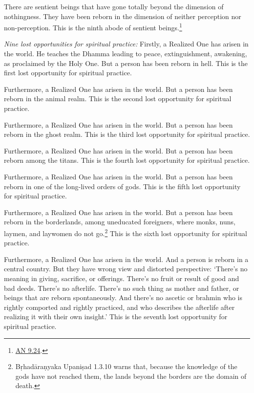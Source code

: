 \documentclass[12pt,openany]{book}%
\begin{document}
There are sentient beings that have gone totally beyond the dimension of nothingness. They have been reborn in the dimension of neither perception nor non-perception. This is the ninth abode of sentient beings.\footnote{\href{https://suttacentral.net/an9.24/en/sujato}{AN 9.24}. } 

\emph{Nine lost opportunities for spiritual practice:} Firstly, a Realized One has arisen in the world. He teaches the Dhamma leading to peace, extinguishment, awakening, as proclaimed by the Holy One. But a person has been reborn in hell. This is the first lost opportunity for spiritual practice. 

Furthermore, a Realized One has arisen in the world. But a person has been reborn in the animal realm. This is the second lost opportunity for spiritual practice. 

Furthermore, a Realized One has arisen in the world. But a person has been reborn in the ghost realm. This is the third lost opportunity for spiritual practice. 

Furthermore, a Realized One has arisen in the world. But a person has been reborn among the titans. This is the fourth lost opportunity for spiritual practice. 

Furthermore, a Realized One has arisen in the world. But a person has been reborn in one of the long-lived orders of gods. This is the fifth lost opportunity for spiritual practice. 

Furthermore, a Realized One has arisen in the world. But a person has been reborn in the borderlands, among uneducated foreigners, where monks, nuns, laymen, and laywomen do not go.\footnote{\textsanskrit{Bṛhadāraṇyaka} \textsanskrit{Upaniṣad} 1.3.10 warns that, because the knowledge of the gods have not reached them, the lands beyond the borders are the domain of death. } This is the sixth lost opportunity for spiritual practice. 

Furthermore, a Realized One has arisen in the world. And a person is reborn in a central country. But they have wrong view and distorted perspective: ‘There’s no meaning in giving, sacrifice, or offerings. There’s no fruit or result of good and bad deeds. There’s no afterlife. There’s no such thing as mother and father, or beings that are reborn spontaneously. And there’s no ascetic or brahmin who is rightly comported and rightly practiced, and who describes the afterlife after realizing it with their own insight.’ This is the seventh lost opportunity for spiritual practice. 
\end{document}
